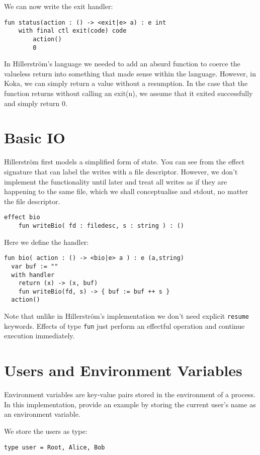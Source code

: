 \documentclass[logo,bsc,singlespacing,parskip]{infthesis}
\begin{document}
We can now write the exit handler:
\begin{lstlisting}
fun status(action : () -> <exit|e> a) : e int
    with final ctl exit(code) code
        action()
        0
\end{lstlisting}
In Hillerström's language we needed to add an absurd function to coerce the valueless return into something that made sense within the language. However, in Koka, we can simply return a value without a resumption. In the case that the function returns without calling an exit(n), we assume that it exited successfully and simply return 0.

\section{Basic IO}
Hillerström first models a simplified form of state. You can see from the effect signature that can label the writes with a file descriptor. However, we don't implement the functionality until later and treat all writes as if they are happening to the same file, which we shall conceptualise and stdout, no matter the file descriptor.

\begin{lstlisting}
effect bio
    fun writeBio( fd : filedesc, s : string ) : ()
\end{lstlisting}

Here we define the handler:

\begin{lstlisting}
fun bio( action : () -> <bio|e> a ) : e (a,string)
  var buf := ""    
  with handler
    return (x) -> (x, buf)
    fun writeBio(fd, s) -> { buf := buf ++ s }
  action()
\end{lstlisting}

Note that unlike in Hillerström's implementation we don't need explicit \texttt{resume} keywords. Effects of type \texttt{fun} just perform an effectful operation and continue execution immediately. 

\section{Users and Environment Variables}
Environment variables are key-value pairs stored in the environment of a process. In this implementation, provide an example by storing the current user's name as an environment variable.

We store the users as type:
\begin{lstlisting}
type user = Root, Alice, Bob
\end{lstlisting}
\end{document}
